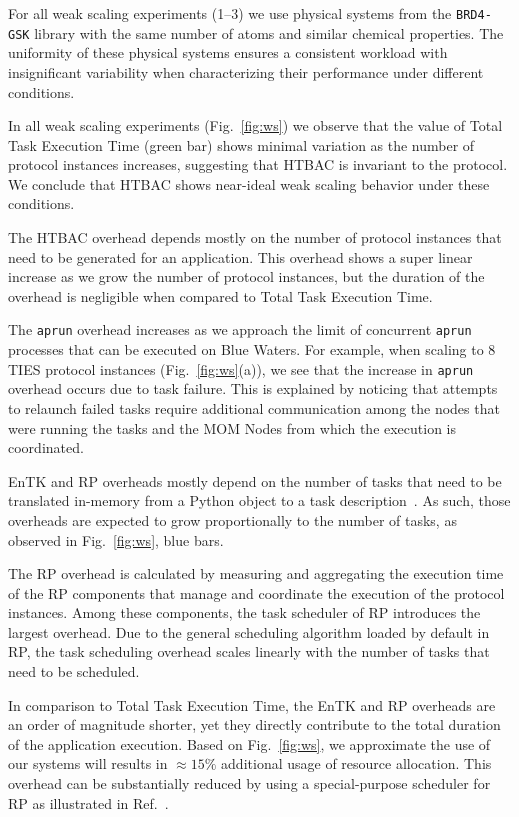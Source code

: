 For all weak scaling experiments (1--3) we use physical systems from the
\texttt{BRD4-GSK} library with the same number of atoms and similar chemical
properties. The uniformity of these physical systems ensures a consistent
workload with insignificant variability when characterizing their performance
under different conditions.

In all weak scaling experiments (Fig.~\ref{fig:ws}) we observe that the value
of Total Task Execution Time (green bar) shows minimal variation as the
number of protocol instances increases, suggesting that HTBAC is invariant to
the protocol. We conclude that HTBAC shows near-ideal weak scaling behavior
under these conditions.

The HTBAC overhead depends mostly on the number of protocol instances that
need to be generated for an application. This overhead shows a super linear
increase as we grow the number of protocol instances, but the duration of the
overhead is negligible when compared to Total Task Execution Time.

The \texttt{aprun} overhead increases as we approach the limit of concurrent
\texttt{aprun} processes that can be executed on Blue Waters. For example,
when scaling to 8 TIES protocol instances (Fig.~\ref{fig:ws}(a)), we see that
the increase in \texttt{aprun} overhead occurs due to task failure. This is
explained by noticing that attempts to relaunch failed tasks require
additional communication among the nodes that were running the tasks and the
MOM Nodes from which the execution is coordinated.

EnTK and RP overheads mostly depend on the number of tasks that need to be
translated in-memory from a Python object to a task
description~\cite{dakka2017,merzky2018}. As such, those overheads are
expected to grow proportionally to the number of tasks, as observed in
Fig.~\ref{fig:ws}, blue bars.

The RP overhead is calculated by measuring and aggregating the execution time
of the RP components that manage and coordinate the execution of the protocol
instances. Among these components, the task scheduler of RP introduces the
largest overhead. Due to the general scheduling algorithm loaded by default
in RP, the task scheduling overhead scales linearly with the number of tasks
that need to be scheduled.

In comparison to Total Task Execution Time, the EnTK and RP overheads are an
order of magnitude shorter, yet they directly contribute to the total
duration of the application execution. Based on Fig.~\ref{fig:ws}, we
approximate the use of our systems will results in $\approx15\%$ additional
usage of resource allocation. This overhead can be substantially reduced by
using a special-purpose scheduler for RP as illustrated in
Ref.~\cite{merzky2018}.

